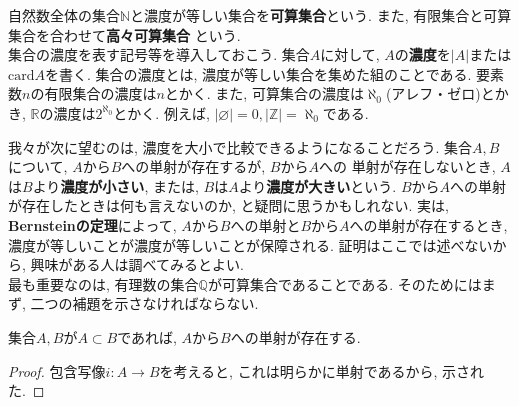 \documentclass[a4j,dvipdfmx]{jsarticle}
\numberwithin{equation}{section}
\begin{document}
                自然数全体の集合$\mathbb{N}$と濃度が等しい集合を\textbf{可算集合}という. また, 有限集合と可算集合を合わせて\textbf{高々可算集合}
                という.\\

                集合の濃度を表す記号等を導入しておこう. 集合$A$に対して, $A$の\textbf{濃度}を$|A|$または$\mathrm{card}A$を書く.
                集合の濃度とは, 濃度が等しい集合を集めた組のことである. 要素数$n$の有限集合の濃度は$n$とかく. また, 可算集合の濃度は$\aleph_0$(アレフ・ゼロ)とかき,  
                $\mathbb{R}$の濃度は$2^{\aleph_0}$とかく. 例えば, $|\varnothing|=0,|\mathbb{Z}|=\aleph_0$である.
                \clearpage

                我々が次に望むのは, 濃度を大小で比較できるようになることだろう. 集合$A,B$について, $A$から$B$への単射が存在するが, $B$から$A$への
                単射が存在しないとき, $A$は$B$より\textbf{濃度が小さい}, または, $B$は$A$より\textbf{濃度が大きい}という.
                $B$から$A$への単射が存在したときは何も言えないのか, と疑問に思うかもしれない. 実は, \textbf{Bernsteinの定理}によって, $A$から$B$への単射と$B$から$A$への単射が存在するとき, 濃度が等しいことが濃度が等しいことが保障される.
                証明はここでは述べないから, 興味がある人は調べてみるとよい.\\

                最も重要なのは, 有理数の集合$\mathbb{Q}$が可算集合であることである. そのためにはまず, 二つの補題を示さなければならない.
                \begin{screen}
                    集合$A,B$が$A\subset B$であれば, $A$から$B$への単射が存在する.
                \end{screen}
                \begin{proof}
                    包含写像$i:A\rightarrow B$を考えると, これは明らかに単射であるから, 示された.
                \end{proof}
\end{document}
